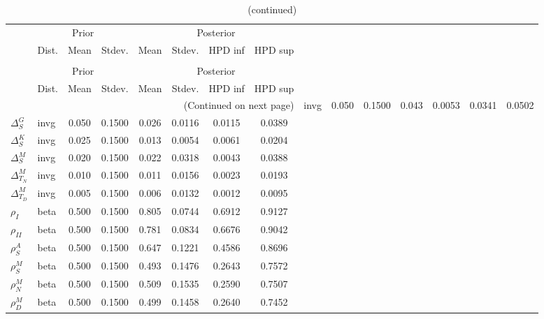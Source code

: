  
\begin{center}
\begin{longtable}{llcccccc} 
\caption{Results from Metropolis-Hastings (parameters)}
 \label{Table:MHPosterior:1}\\
\toprule 
  & \multicolumn{3}{c}{Prior}  &  \multicolumn{4}{c}{Posterior} \\
  \cmidrule(r{.75em}){2-4} \cmidrule(r{.75em}){5-8}
  & Dist. & Mean  & Stdev. & Mean & Stdev. & HPD inf & HPD sup\\
\midrule \endfirsthead 
\caption{(continued)}\\\toprule 
  & \multicolumn{3}{c}{Prior}  &  \multicolumn{4}{c}{Posterior} \\
  \cmidrule(r{.75em}){2-4} \cmidrule(r{.75em}){5-8}
  & Dist. & Mean  & Stdev. & Mean & Stdev. & HPD inf & HPD sup\\
\midrule \endhead 
\bottomrule \multicolumn{8}{r}{(Continued on next page)} \endfoot 
\bottomrule \endlastfoot 
${\Delta^{A}_{S}}$ & invg &   0.050 & 0.1500 &   0.043& 0.0053 &  0.0341 &  0.0502 \\ 
${\Delta^{G}_{S}}$ & invg &   0.050 & 0.1500 &   0.026& 0.0116 &  0.0115 &  0.0389 \\ 
${\Delta^{K}_{S}}$ & invg &   0.025 & 0.1500 &   0.013& 0.0054 &  0.0061 &  0.0204 \\ 
${\Delta^{M}_{S}}$ & invg &   0.020 & 0.1500 &   0.022& 0.0318 &  0.0043 &  0.0388 \\ 
${\Delta^{M}_{T_N}}$ & invg &   0.010 & 0.1500 &   0.011& 0.0156 &  0.0023 &  0.0193 \\ 
${\Delta^{M}_{T_D}}$ & invg &   0.005 & 0.1500 &   0.006& 0.0132 &  0.0012 &  0.0095 \\ 
${\rho_{I}}$ & beta &   0.500 & 0.1500 &   0.805& 0.0744 &  0.6912 &  0.9127 \\ 
${\rho_{II}}$ & beta &   0.500 & 0.1500 &   0.781& 0.0834 &  0.6676 &  0.9042 \\ 
${\rho^{A}_{S}}$ & beta &   0.500 & 0.1500 &   0.647& 0.1221 &  0.4586 &  0.8696 \\ 
${\rho^{M}_{S}}$ & beta &   0.500 & 0.1500 &   0.493& 0.1476 &  0.2643 &  0.7572 \\ 
${\rho^{M}_{N}}$ & beta &   0.500 & 0.1500 &   0.509& 0.1535 &  0.2590 &  0.7507 \\ 
${\rho^{M}_{D}}$ & beta &   0.500 & 0.1500 &   0.499& 0.1458 &  0.2640 &  0.7452 \\ 
\end{longtable}
 \end{center}
